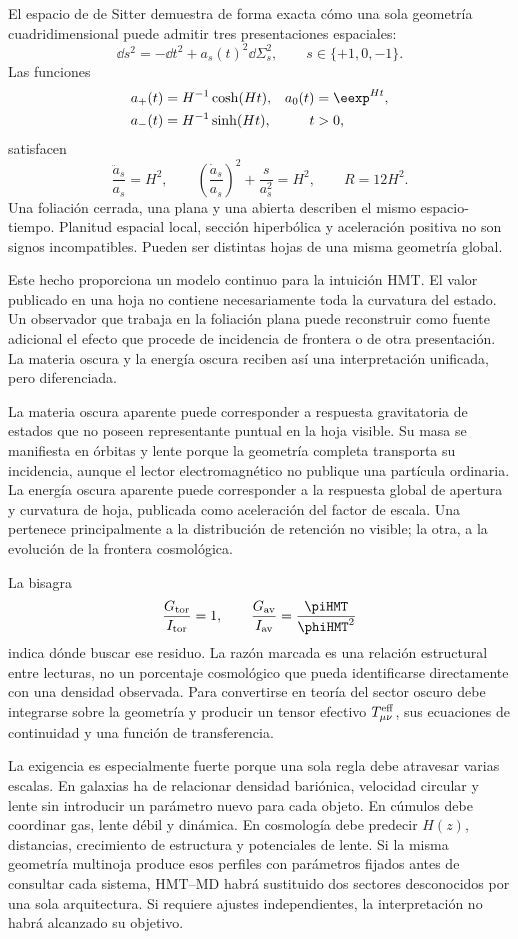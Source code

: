 El espacio de de Sitter demuestra de forma exacta cómo una sola geometría
cuadridimensional puede admitir tres presentaciones espaciales:
\[
 \dd s^2
 =
 -\dd t^2+a_s(t)^2\dd\Sigma_s^2,
 \qquad s\in\{+1,0,-1\}.
\]
Las funciones
\[
 \begin{aligned}
 a_+(t)&=H^{-1}\cosh(Ht),
 &
 a_0(t)&=\eexp^{Ht},\\
 a_-(t)&=H^{-1}\sinh(Ht),
 &
 t&>0,
 \end{aligned}
\]
satisfacen
\[
 \frac{\ddot a_s}{a_s}=H^2,
\qquad
 \left(\frac{\dot a_s}{a_s}\right)^2
 +
 \frac{s}{a_s^2}
 =
 H^2,
\qquad
 R=12H^2.
\]
Una foliación cerrada, una plana y una abierta describen el mismo espacio-tiempo.
Planitud espacial local, sección hiperbólica y aceleración positiva no son signos
incompatibles. Pueden ser distintas hojas de una misma geometría global.

Este hecho proporciona un modelo continuo para la intuición HMT. El valor publicado
en una hoja no contiene necesariamente toda la curvatura del estado. Un observador
que trabaja en la foliación plana puede reconstruir como fuente adicional el efecto
que procede de incidencia de frontera o de otra presentación. La materia oscura y
la energía oscura reciben así una interpretación unificada, pero diferenciada.

La materia oscura aparente puede corresponder a respuesta gravitatoria de estados
que no poseen representante puntual en la hoja visible. Su masa se manifiesta en
órbitas y lente porque la geometría completa transporta su incidencia, aunque el
lector electromagnético no publique una partícula ordinaria. La energía oscura
aparente puede corresponder a la respuesta global de apertura y curvatura de hoja,
publicada como aceleración del factor de escala. Una pertenece principalmente a la
distribución de retención no visible; la otra, a la evolución de la frontera
cosmológica.

La bisagra
\[
 \frac{G_{\rm tor}}{I_{\rm tor}}=1,
 \qquad
 \frac{G_{\rm av}}{I_{\rm av}}
 =
 \frac{\piHMT}{\phiHMT^2}
\]
indica dónde buscar ese residuo. La razón marcada es una relación estructural entre
lecturas, no un porcentaje cosmológico que pueda identificarse directamente con una
densidad observada. Para convertirse en teoría del sector oscuro debe integrarse
sobre la geometría y producir un tensor efectivo
\(T^{\rm eff}_{\mu\nu}\), sus ecuaciones de continuidad y una función de
transferencia.

La exigencia es especialmente fuerte porque una sola regla debe atravesar varias
escalas. En galaxias ha de relacionar densidad bariónica, velocidad circular y lente
sin introducir un parámetro nuevo para cada objeto. En cúmulos debe coordinar gas,
lente débil y dinámica. En cosmología debe predecir \(H(z)\), distancias,
crecimiento de estructura y potenciales de lente. Si la misma geometría multinoja
produce esos perfiles con parámetros fijados antes de consultar cada sistema,
HMT--MD habrá sustituido dos sectores desconocidos por una sola arquitectura. Si
requiere ajustes independientes, la interpretación no habrá alcanzado su objetivo.

